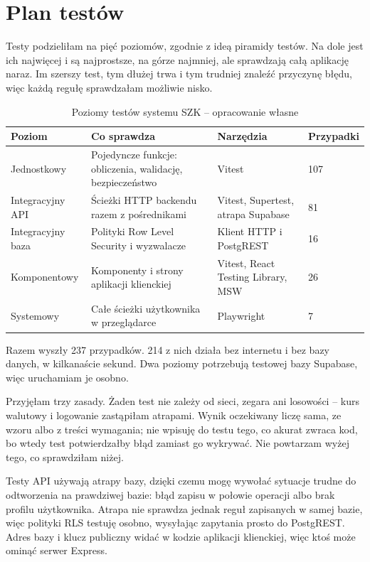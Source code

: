\section{Plan testów}
\label{sec:strategia-testow}

Testy podzieliłam na pięć poziomów, zgodnie z ideą piramidy testów. Na dole jest ich najwięcej i są najprostsze, na górze najmniej, ale sprawdzają całą aplikację naraz. Im szerszy test, tym dłużej trwa i tym trudniej znaleźć przyczynę błędu, więc każdą regułę sprawdzałam możliwie nisko.

\begin{table}[htbp]
\centering
\caption{Poziomy testów systemu SZK -- opracowanie własne}
\label{tab:poziomy-testow}
\begin{tabular}{|p{}|p{}|p{}|p{}|}
\hline
\textbf{Poziom} & \textbf{Co sprawdza} & \textbf{Narzędzia} & \textbf{Przypadki} \\
\hline
Jednostkowy & Pojedyncze funkcje: obliczenia, walidację, bezpieczeństwo & Vitest & 107 \\
\hline
Integracyjny API & Ścieżki HTTP backendu razem z pośrednikami & Vitest, Supertest, atrapa Supabase & 81 \\
\hline
Integracyjny baza & Polityki Row Level Security i wyzwalacze & Klient HTTP i PostgREST & 16 \\
\hline
Komponentowy & Komponenty i strony aplikacji klienckiej & Vitest, React Testing Library, MSW & 26 \\
\hline
Systemowy & Całe ścieżki użytkownika w przeglądarce & Playwright & 7 \\
\hline
\end{tabular}
\end{table}

Razem wyszły 237 przypadków. 214 z nich działa bez internetu i bez bazy danych, w kilkanaście sekund. Dwa poziomy potrzebują testowej bazy Supabase, więc uruchamiam je osobno.

Przyjęłam trzy zasady. Żaden test nie zależy od sieci, zegara ani losowości -- kurs walutowy i logowanie zastąpiłam atrapami. Wynik oczekiwany liczę sama, ze wzoru albo z treści wymagania; nie wpisuję do testu tego, co akurat zwraca kod, bo wtedy test potwierdzałby błąd zamiast go wykrywać. Nie powtarzam wyżej tego, co sprawdziłam niżej.

Testy API używają atrapy bazy, dzięki czemu mogę wywołać sytuacje trudne do odtworzenia na prawdziwej bazie: błąd zapisu w połowie operacji albo brak profilu użytkownika. Atrapa nie sprawdza jednak reguł zapisanych w samej bazie, więc polityki RLS testuję osobno, wysyłając zapytania prosto do PostgREST. Adres bazy i klucz publiczny widać w kodzie aplikacji klienckiej, więc ktoś może ominąć serwer Express.
